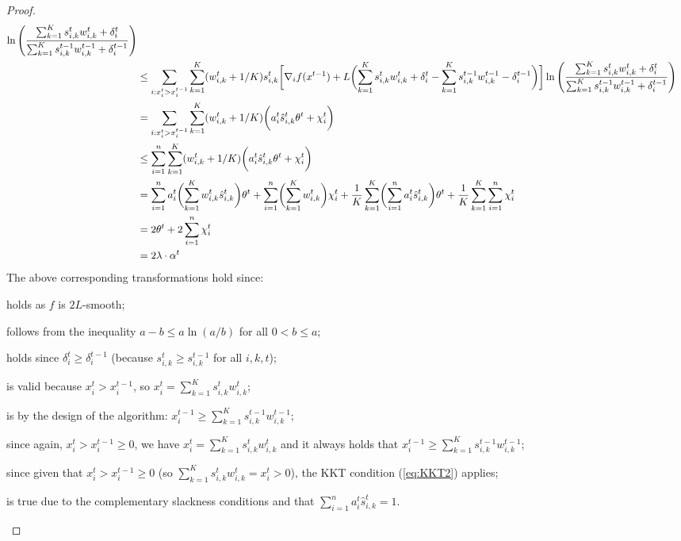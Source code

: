 \begin{proof}
\begin{align}
            \ln \left(\frac{ \sum_{k=1}^{K} s_{i,k}^{t} w_{i,k}^{t}  + \delta_{i}^{t}}{\sum_{k=1}^{K}  s_{i,k}^{t-1} w_{i,k}^{t-1}  + \delta_{i}^{t-1}}  \right) \notag \\
%
&\leq \sum_{i: x_{i}^{t} > x_{i}^{t-1}} \sum_{k=1}^{K} (w_{i,k}^{t} + 1/K) s_{i,k}^{t} \biggl[ \nabla_{i} f(x^{t-1}) + L\biggl( \sum_{k=1}^{K} s_{i,k}^{t} w_{i,k}^{t} + \delta_{i}^{t} - \sum_{k=1}^{K} s_{i,k}^{t-1} w_{i,k}^{t-1} - \delta_{i}^{t-1} \biggr) \biggr]
            \ln \left(\frac{ \sum_{k=1}^{K} s_{i,k}^{t} w_{i,k}^{t}  + \delta_{i}^{t}}{\sum_{k=1}^{K}  s_{i,k}^{t-1} w_{i,k}^{t-1}  + \delta_{i}^{t-1}}  \right) \\
%
&=  \sum_{i: x_{i}^{t} > x_{i}^{t-1}} \sum_{k=1}^{K} (w_{i,k}^{t} + 1/K) \biggl( a_{i}^{t} \hat{s}_{i,k}^{t} \theta^{t} + \chi_{i}^{t} \biggr)  \\
%
&\leq \sum_{i=1}^{n} \sum_{k=1}^{K} (w_{i,k}^{t} + 1/K) \biggl( a_{i}^{t} \hat{s}_{i,k}^{t} \theta^{t} + \chi_{i}^{t} \biggr) \notag \\
%
&= \sum_{i=1}^{n} a_{i}^{t} \biggl(\sum_{k=1}^{K} w_{i,k}^{t} \hat{s}_{i,k}^{t} \biggr) \theta^t + \sum_{i=1}^{n} \biggl( \sum_{k=1}^{K} w_{i,k}^{t} \biggr) \chi_{i}^{t}
+ \frac{1}{K}  \sum_{k=1}^{K} \biggl( \sum_{i=1}^{n} a_{i}^{t}  \hat{s}_{i,k}^{t}  \biggr) \theta^t + \frac{1}{K} \sum_{k=1}^{K} \sum_{i=1}^{n} \chi_{i}^{t} 		\notag \\
%
&= 2 \theta^{t} + 2\sum_{i=1}^{n} \chi_{i}^{t} \\
%
&= 2\lambda \cdot \alpha^{t}	\notag
\end{align}
%
The above corresponding transformations hold since:
\begin{compactenum}[(1)]
    \setcounter{enumi}{8}
    \item holds as $f$ is $2L$-smooth;
    \item follows from the inequality $a - b \leq a \ln(a/b)$ for all $0 < b \leq a$;
    \item holds since $\delta_{i}^{t} \geq \delta_{i}^{t-1}$ (because $s_{i,k}^{t} \geq s_{i,k}^{t-1}$ for all $i,k,t$);
    \item is valid because $x_{i}^{t} > x_{i}^{t-1}$, so $x_{i}^{t} = \sum_{k=1}^{K}  s_{i,k}^{t} w_{i,k}^{t}$;
    \item is by the design of the algorithm: $x_{i}^{t-1} \geq \sum_{k=1}^{K}  s_{i,k}^{t-1} w_{i,k}^{t-1}$;
    \item since again, $x_{i}^{t} > x_{i}^{t-1} \geq 0$, we have $x_{i}^{t} = \sum_{k=1}^{K}  s_{i,k}^{t} w_{i,k}^{t}$ and 
    	it always holds that $x_{i}^{t-1} \geq \sum_{k=1}^{K}  s_{i,k}^{t-1} w_{i,k}^{t-1}$;
    \item since given that $x_{i}^{t} > x_{i}^{t-1} \geq 0$ (so $\sum_{k=1}^{K}  s_{i,k}^{t} w_{i,k}^{t} = x_{i}^{t} > 0$), the KKT condition (\ref{eq:KKT2}) applies;
    \item is true due to the complementary slackness conditions
        and that $\sum_{i=1}^{n} a_{i}^{t}  \hat{s}_{i,k}^{t} = 1$.
\end{compactenum}



\end{proof}
